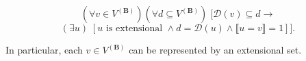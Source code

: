$$(\forall v \in V^{(\mathbf{B})}) (\forall d \subseteq V^{(\mathbf{B})})\; [\mathcal{D}(v) \subseteq d \to$$
$$(\exists u)\; [u \text{ is extensional } \land d = \mathcal{D}(u) \land \llbracket u = v \rrbracket = 1]].$$

In particular, each $v \in V^{(\mathbf{B})}$ can be represented by an extensional set.
